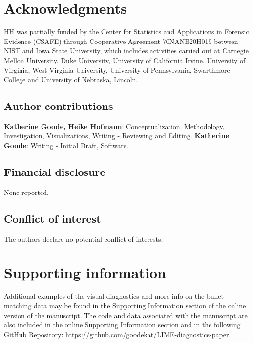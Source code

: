 \documentclass[AMS,STIX2COL]{WileyNJD-v2}\usepackage[]{graphicx}\usepackage[]{color}
\begin{document}
\section*{Acknowledgments}

HH was partially funded by the Center for Statistics and Applications in Forensic Evidence (CSAFE) through Cooperative Agreement 70NANB20H019 between NIST and Iowa State University, which includes activities carried out at Carnegie Mellon University, Duke University, University of California Irvine, University of Virginia, West Virginia University, University of Pennsylvania, Swarthmore College and University of Nebraska, Lincoln.

\subsection*{Author contributions}

{\bf Katherine Goode, Heike Hofmann}: Conceptualization, Methodology, Investigation, Visualizations, Writing - Reviewing and Editing. {\bf Katherine Goode}: Writing - Initial Draft, Software.

\subsection*{Financial disclosure}

None reported.

\subsection*{Conflict of interest}

The authors declare no potential conflict of interests.

\section*{Supporting information}

Additional examples of the visual diagnostics and more info on the bullet matching data may be found in the Supporting Information section of the online version of the manuscript. The code  and  data associated with the manuscript are also included in the online Supporting Information section and  in the following GitHub Repository: \href{https://github.com/goodekat/LIME-diagnostics-paper}{https://github.com/goodekat/LIME-diagnostics-paper}.



\newpage
\end{document}
